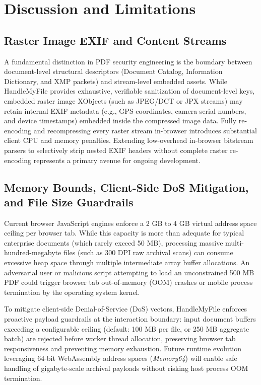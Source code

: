 \documentclass[journal]{IEEEtran}
\begin{document}
\section{Discussion and Limitations}

\subsection{Raster Image EXIF and Content Streams}
A fundamental distinction in PDF security engineering is the boundary between document-level structural descriptors (Document Catalog, Information Dictionary, and XMP packets) and stream-level embedded assets. While HandleMyFile provides exhaustive, verifiable sanitization of document-level keys, embedded raster image XObjects (such as JPEG/DCT or JPX streams) may retain internal EXIF metadata (e.g., GPS coordinates, camera serial numbers, and device timestamps) embedded inside the compressed image data. Fully re-encoding and recompressing every raster stream in-browser introduces substantial client CPU and memory penalties. Extending low-overhead in-browser bitstream parsers to selectively strip nested EXIF headers without complete raster re-encoding represents a primary avenue for ongoing development.

\subsection{Memory Bounds, Client-Side DoS Mitigation, and File Size Guardrails}
Current browser JavaScript engines enforce a 2 GB to 4 GB virtual address space ceiling per browser tab. While this capacity is more than adequate for typical enterprise documents (which rarely exceed 50 MB), processing massive multi-hundred-megabyte files (such as 300 DPI raw archival scans) can consume excessive heap space through multiple intermediate array buffer allocations. An adversarial user or malicious script attempting to load an unconstrained 500 MB PDF could trigger browser tab out-of-memory (OOM) crashes or mobile process termination by the operating system kernel. 

To mitigate client-side Denial-of-Service (DoS) vectors, HandleMyFile enforces proactive payload guardrails at the interaction boundary: input document buffers exceeding a configurable ceiling (default: 100 MB per file, or 250 MB aggregate batch) are rejected before worker thread allocation, preserving browser tab responsiveness and preventing memory exhaustion. Future runtime evolution leveraging 64-bit WebAssembly address spaces (\textit{Memory64}) will enable safe handling of gigabyte-scale archival payloads without risking host process OOM termination.
\end{document}
